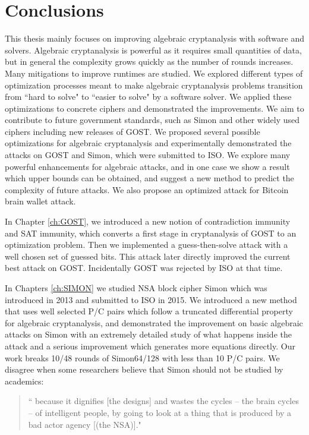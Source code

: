 \chapter{Conclusions}
\label{chapterlabel4}

This thesis mainly focuses on improving algebraic cryptanalysis with software and solvers. Algebraic cryptanalysis is powerful as it requires small quantities of data, but in general the complexity grows quickly as the number of rounds increases. Many mitigations to improve runtimes are studied. 
We explored different types of optimization processes meant to make algebraic cryptanalysis problems transition from ``hard to solve" to ``easier to solve" by a software solver. We applied these optimizations to concrete ciphers and demonstrated the improvements. We aim to contribute to future government standards, such as Simon and other widely used ciphers including new releases of GOST.  We proposed several possible optimizations for algebraic cryptanalysis and experimentally demonstrated the attacks on GOST and Simon, which were submitted to ISO. We explore many powerful enhancements for algebraic attacks, and in one case we show a result which upper bounds can be obtained, and suggest a new method to predict the complexity of future attacks. 
We also propose an optimized attack for Bitcoin brain wallet attack.  

In Chapter \ref{ch:GOST}, we introduced a new notion of contradiction immunity and SAT immunity, which converts a first stage in cryptanalysis of GOST to an optimization problem. Then we implemented a guess-then-solve attack with a well chosen set of guessed bits. This attack later directly improved the current best attack on GOST. Incidentally GOST was rejected by ISO at that time. 

In Chapters \ref{ch:SIMON} we studied NSA block cipher Simon which was introduced in 2013 and submitted to ISO in 2015. 
We introduced a new method that uses well selected P/C pairs which follow a truncated differential property for algebraic cryptanalysis, and demonstrated the improvement on basic algebraic attacks on Simon with an extremely detailed study of what happens inside the attack and a serious improvement which generates more equations directly. Our work breaks 10/48 rounds of Simon64/128 with less than 10 P/C pairs.
We disagree when some researchers believe that Simon should not be studied by academics: 

\begin{quotation}
	``%
	because it dignifies [the designs] and wastes the cycles – the brain cycles – of intelligent people, by going to look at a thing that is produced by a bad actor agency [(the NSA)]." \\ 
\end{quotation}

